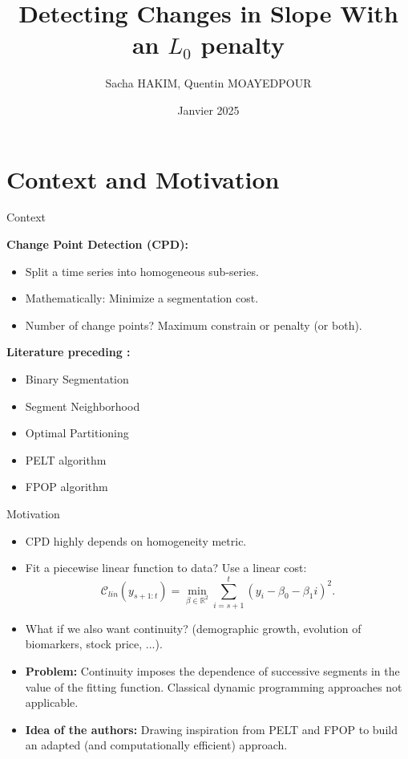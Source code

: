 \documentclass[10pt, xcolor=dvipsnames]{beamer}
\title{Detecting Changes in Slope With an $L_0$ penalty}
\author{Sacha HAKIM, Quentin MOAYEDPOUR}
\institute[]{
   \textcolor{QPblue!75}{M2 MVA - École Normale Supérieure Paris-Saclay \\ Machine Learning for Time Series
   \texttt{}} \\ [1ex]
}
\date{Janvier 2025}
\begin{document}
\begin{frame}[plain]
  \titlepage
\end{frame}


\section{Context and Motivation}

\begin{frame}{Context}

\textbf{Change Point Detection (CPD):} 
\begin{itemize}
    \item Split a time series into homogeneous sub-series.
    \item Mathematically: Minimize a segmentation cost.
    \item Number of change points? Maximum constrain or penalty (or both).
\end{itemize} 

\vspace{0.5cm}

\textbf{Literature preceding \textcite{maidstone2019}:}
\begin{itemize}
    \item Binary Segmentation \parencite{scott1974}
    \item Segment Neighborhood \parencite{auger1989}
    \item Optimal Partitioning \parencite{jackson2005}
    \item PELT algorithm \parencite{killick2012}
    \item FPOP algorithm \parencite{maidstone2017}

\end{itemize}

\end{frame}

\begin{frame}{Motivation}
\begin{itemize}
    \item CPD highly depends on homogeneity metric.
    \item Fit a piecewise linear function to data? Use a linear cost:
    $$
    \mathcal{C}_{lin}(y_{s+1:t}) = \min\limits_{\beta \in \mathbb{R}^2} \sum_{i=s+1}^t (y_i - \beta_0 - \beta_1 i)^2.
    $$
    \item What if we also want continuity? (demographic growth, evolution of biomarkers, stock price, ...).
    \item \textbf{Problem:} Continuity imposes the dependence of successive segments in the value of the fitting function. Classical dynamic programming approaches not applicable.
    \item \textbf{Idea of the authors:} Drawing inspiration from PELT and FPOP to build an adapted (and computationally efficient) approach. 
\end{itemize}
\end{frame}
\end{document}
